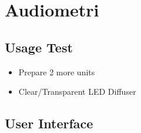 \documentclass{article} %
\begin{document}
\section{Audiometri}

\subsection{Usage Test}

\begin{itemize}
    \item Prepare 2 more units

    \item Clear/Transparent LED Diffuser
\end{itemize}

\subsection{User Interface}
\end{document}
